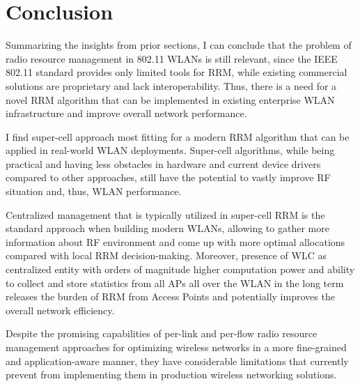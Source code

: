
\section {Conclusion}
\label{chap:lr:sec:conclusion}
Summarizing the insights from prior sections, I can conclude that the problem of radio resource management in 802.11 WLANs is still relevant, since the IEEE 802.11 standard provides only limited tools for RRM, while existing commercial solutions are proprietary and lack interoperability. Thus, there is a need for a novel RRM algorithm that can be implemented in existing enterprise WLAN infrastructure and improve overall network performance.

I find super-cell approach most fitting for a modern RRM algorithm that can be applied in real-world WLAN deployments. Super-cell algorithms, while being practical and having less obstacles in hardware and current device drivers compared to other approaches, still have the potential to vastly improve RF situation and, thus, WLAN performance.

Centralized management that is typically utilized in super-cell RRM is the standard approach when building modern WLANs, allowing to gather more information about RF environment and come up with more optimal allocations compared with local RRM decision-making.
Moreover, presence of WLC as centralized entity with orders of magnitude higher computation power and ability to collect and store statistics from all APs all over the WLAN in the long term releases the burden of RRM from Access Points and potentially improves the overall network efficiency.

Despite the promising capabilities of per-link and per-flow radio resource management approaches for optimizing wireless networks in a more fine-grained and application-aware manner, they have considerable limitations that currently prevent from implementing them in production wireless networking solutions.

